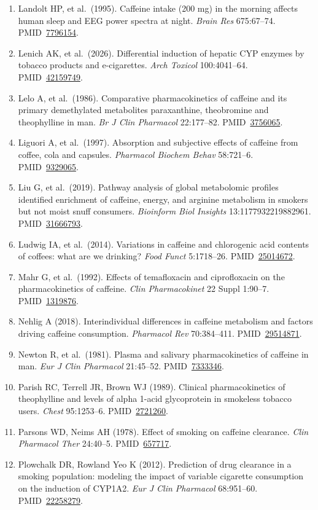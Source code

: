 \documentclass[10pt,a4paper]{article}
\newcommand{\pmid}[1]{PMID~\href{https://pubmed.ncbi.nlm.nih.gov/#1/}{#1}}
\begin{document}
\begin{enumerate}[leftmargin=*,label={}]
\item Landolt HP, et al.\ (1995). Caffeine intake (200 mg) in the morning affects human sleep and EEG power spectra at night. \emph{Brain Res} 675:67--74. \pmid{7796154}.
\item Lenich AK, et al.\ (2026). Differential induction of hepatic CYP enzymes by tobacco products and e-cigarettes. \emph{Arch Toxicol} 100:4041--64. \pmid{42159749}.
\item Lelo A, et al.\ (1986). Comparative pharmacokinetics of caffeine and its primary demethylated metabolites paraxanthine, theobromine and theophylline in man. \emph{Br J Clin Pharmacol} 22:177--82. \pmid{3756065}.
\item Liguori A, et al.\ (1997). Absorption and subjective effects of caffeine from coffee, cola and capsules. \emph{Pharmacol Biochem Behav} 58:721--6. \pmid{9329065}.
\item Liu G, et al.\ (2019). Pathway analysis of global metabolomic profiles identified enrichment of caffeine, energy, and arginine metabolism in smokers but not moist snuff consumers. \emph{Bioinform Biol Insights} 13:1177932219882961. \pmid{31666793}.
\item Ludwig IA, et al.\ (2014). Variations in caffeine and chlorogenic acid contents of coffees: what are we drinking? \emph{Food Funct} 5:1718--26. \pmid{25014672}.
\item Mahr G, et al.\ (1992). Effects of temafloxacin and ciprofloxacin on the pharmacokinetics of caffeine. \emph{Clin Pharmacokinet} 22 Suppl 1:90--7. \pmid{1319876}.
\item Nehlig A (2018). Interindividual differences in caffeine metabolism and factors driving caffeine consumption. \emph{Pharmacol Rev} 70:384--411. \pmid{29514871}.
\item Newton R, et al.\ (1981). Plasma and salivary pharmacokinetics of caffeine in man. \emph{Eur J Clin Pharmacol} 21:45--52. \pmid{7333346}.
\item Parish RC, Terrell JR, Brown WJ (1989). Clinical pharmacokinetics of theophylline and levels of alpha 1-acid glycoprotein in smokeless tobacco users. \emph{Chest} 95:1253--6. \pmid{2721260}.
\item Parsons WD, Neims AH (1978). Effect of smoking on caffeine clearance. \emph{Clin Pharmacol Ther} 24:40--5. \pmid{657717}.
\item Plowchalk DR, Rowland Yeo K (2012). Prediction of drug clearance in a smoking population: modeling the impact of variable cigarette consumption on the induction of CYP1A2. \emph{Eur J Clin Pharmacol} 68:951--60. \pmid{22258279}.

\end{enumerate}
\end{document}
